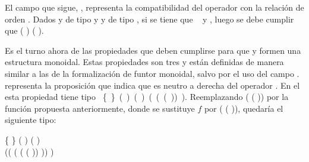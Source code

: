 El campo que sigue, , representa la compatibilidad del operador  con la relación de orden . Dados  y  de tipo  y  y  de tipo , si se tiene que \hbox{  } y   , luego se debe cumplir que ( )  ( ). 

Es el turno ahora de las propiedades que deben cumplirse para que  y  formen una estructura monoidal. Estas propiedades son tres y están definidas de manera similar a las de la formalización de funtor monoidal, salvo por el uso del campo .  representa la proposición que indica que  es neutro a derecha del operador . En el   esta propiedad tiene tipo \hbox{\AgdaSymbol{$\forall$} \{ \AgdaSymbol{:} \} \AgdaSymbol{$\rightarrow$} ( \AgdaSymbol{:} ) \AgdaSymbol{$\rightarrow$} (  )  ( (\AgdaSymbol{$\lambda$}  \AgdaSymbol{$\rightarrow$} ( )) )}. Reemplazando  (\AgdaSymbol{$\lambda$}  \AgdaSymbol{$\rightarrow$} ( )) por la función propuesta anteriormente, donde se sustituye $f$ por (\AgdaSymbol{$\lambda$}  \AgdaSymbol{$\rightarrow$} ( )), quedaría el siguiente tipo: 
\begin{center}
\AgdaSymbol{$\forall$} \{ \AgdaSymbol{:} \} \AgdaSymbol{$\rightarrow$} ( \AgdaSymbol{:} ) \AgdaSymbol{$\rightarrow$} (  )   \\ ((\AgdaSymbol{$\lambda$}  \AgdaSymbol{$\rightarrow$}  \AgdaField{$\gg=$} (\AgdaSymbol{$\lambda$}  \AgdaSymbol{$\rightarrow$}  (\AgdaSymbol{$\lambda$}  \AgdaSymbol{$\rightarrow$} ( )) )) )
\end{center}

